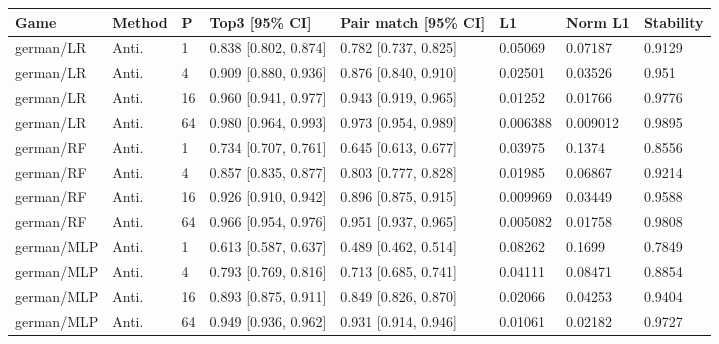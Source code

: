 \endgroup


\begingroup\footnotesize\setlength{\tabcolsep}{3pt}
\begin{tabular}{llllllll}
\toprule
Game & Method & P & Top3 [95\% CI] & Pair match [95\% CI] & L1 & Norm L1 & Stability \\
\midrule
german/LR & Anti. & 1 & 0.838 [0.802, 0.874] & 0.782 [0.737, 0.825] & 0.05069 & 0.07187 & 0.9129 \\
german/LR & Anti. & 4 & 0.909 [0.880, 0.936] & 0.876 [0.840, 0.910] & 0.02501 & 0.03526 & 0.951 \\
german/LR & Anti. & 16 & 0.960 [0.941, 0.977] & 0.943 [0.919, 0.965] & 0.01252 & 0.01766 & 0.9776 \\
german/LR & Anti. & 64 & 0.980 [0.964, 0.993] & 0.973 [0.954, 0.989] & 0.006388 & 0.009012 & 0.9895 \\
german/RF & Anti. & 1 & 0.734 [0.707, 0.761] & 0.645 [0.613, 0.677] & 0.03975 & 0.1374 & 0.8556 \\
german/RF & Anti. & 4 & 0.857 [0.835, 0.877] & 0.803 [0.777, 0.828] & 0.01985 & 0.06867 & 0.9214 \\
german/RF & Anti. & 16 & 0.926 [0.910, 0.942] & 0.896 [0.875, 0.915] & 0.009969 & 0.03449 & 0.9588 \\
german/RF & Anti. & 64 & 0.966 [0.954, 0.976] & 0.951 [0.937, 0.965] & 0.005082 & 0.01758 & 0.9808 \\
german/MLP & Anti. & 1 & 0.613 [0.587, 0.637] & 0.489 [0.462, 0.514] & 0.08262 & 0.1699 & 0.7849 \\
german/MLP & Anti. & 4 & 0.793 [0.769, 0.816] & 0.713 [0.685, 0.741] & 0.04111 & 0.08471 & 0.8854 \\
german/MLP & Anti. & 16 & 0.893 [0.875, 0.911] & 0.849 [0.826, 0.870] & 0.02066 & 0.04253 & 0.9404 \\
german/MLP & Anti. & 64 & 0.949 [0.936, 0.962] & 0.931 [0.914, 0.946] & 0.01061 & 0.02182 & 0.9727 \\
\bottomrule
\end{tabular}

\endgroup
